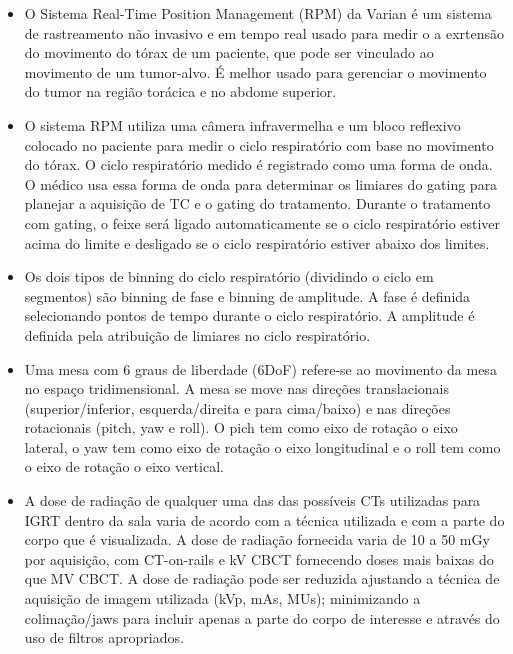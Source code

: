 \documentclass[11pt,a4paper]{article}
\newcounter{exemplo}
\begin{document}
\begin{exemplo}[12. IGRT ]
\begin{itemize}
        \item O Sistema Real-Time Position Management (RPM) da Varian é um sistema de rastreamento não invasivo e em tempo real usado para medir o a exrtensão do movimento do tórax de um paciente, que pode ser vinculado ao movimento de um tumor-alvo. É melhor usado para gerenciar o movimento do tumor na região torácica e no abdome superior.
        
        \item O sistema RPM utiliza uma câmera infravermelha e um bloco reflexivo colocado no paciente para medir o ciclo respiratório com base no movimento do tórax. O ciclo respiratório medido é registrado como uma forma de onda. O médico usa essa forma de onda para determinar os limiares do gating para planejar a aquisição de TC e o gating do tratamento. Durante o tratamento com gating, o feixe será ligado automaticamente se o ciclo respiratório estiver acima do limite e desligado se o ciclo respiratório estiver abaixo dos limites.
        
        \item Os dois tipos de binning do ciclo respiratório (dividindo o ciclo em segmentos) são binning de fase e binning de amplitude. A fase é definida selecionando pontos de tempo durante o ciclo respiratório. A amplitude é definida pela atribuição de limiares no ciclo respiratório.
        
        \item Uma mesa com 6 graus de liberdade (6DoF) refere-se ao movimento da mesa no espaço tridimensional. A mesa se move nas direções translacionais (superior/inferior, esquerda/direita e para cima/baixo) e nas direções rotacionais (pitch, yaw e roll). O pich tem como eixo de rotação o eixo lateral, o yaw tem como eixo de rotação o eixo longitudinal e o roll tem como o eixo de rotação o eixo vertical.
        
        \item A dose de radiação de qualquer uma das das possíveis CTs utilizadas para IGRT dentro da sala varia de acordo com a técnica utilizada e com a parte do corpo que é visualizada. A dose de radiação fornecida varia de 10 a 50 mGy por aquisição, com CT-on-rails e kV CBCT fornecendo doses mais baixas do que MV CBCT. A dose de radiação pode ser reduzida ajustando a técnica de aquisição de imagem utilizada (kVp, mAs, MUs); minimizando a colimação/jaws para incluir apenas a parte do corpo de interesse e através do uso de filtros apropriados.
        

\end{itemize}
\end{exemplo}
\end{document}
